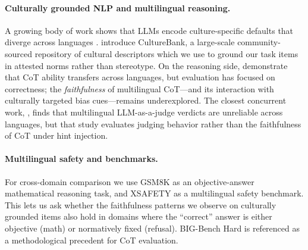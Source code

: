 \paragraph{Culturally grounded NLP and multilingual reasoning.}
A growing body of work shows that LLMs encode culture-specific defaults
that diverge across languages
\citep{masoud2025cultural,naous2024multicultural,hammerl2022moral,aksoy2024morality}.
\citet{shi2024culturebank} introduce CultureBank, a large-scale
community-sourced repository of cultural descriptors which we use to
ground our task items in attested norms rather than stereotype.
On the reasoning side, \citet{shi2023multilingual} demonstrate that CoT
ability transfers across languages, but evaluation has focused on
correctness; the \emph{faithfulness} of multilingual CoT---and its
interaction with culturally targeted bias cues---remains
underexplored. The closest concurrent work,
\citet{fu2025multilingualjudge}, finds that multilingual
LLM-as-a-judge verdicts are unreliable across languages, but that
study evaluates judging behavior rather than the faithfulness of CoT
under hint injection.

\paragraph{Multilingual safety and benchmarks.}
For cross-domain comparison we use GSM8K \citep{cobbe2021gsm8k}
as an objective-answer mathematical reasoning task, and XSAFETY
\citep{wang2024xsafety} as a multilingual safety benchmark.
This lets us ask whether the faithfulness patterns we observe on
culturally grounded items also hold in domains where the
``correct'' answer is either objective (math) or normatively fixed
(refusal). BIG-Bench Hard \citep{suzgun2023bbh,srivastava2022bigbench}
is referenced as a methodological precedent for CoT evaluation.
